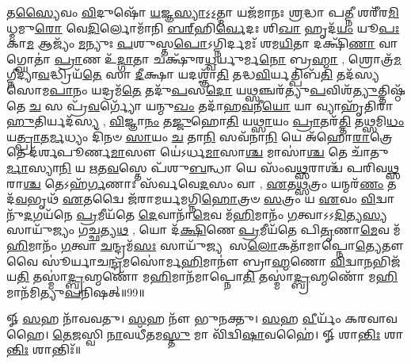 𑌤\-\ul{𑌸𑍍𑌯𑍈}\-𑌵𑌂  \ul{𑌵𑌿}\-𑌦𑍁𑌷𑍋᳴ \ul{𑌯}\-𑌜𑍍𑌞\-\ul{𑌸𑍍𑌯𑌾}\-𑌽॒𑌽॒𑌤𑍍𑌮𑌾 𑌯𑌜᳴𑌮𑌾𑌨𑌃 \ul{𑌶𑍍𑌰}\-𑌦𑍍𑌧𑌾 𑌪\-\ul{𑌤𑍍𑌨𑍀} 𑌶𑌰𑍀᳴𑌰\-\ul{𑌮𑌿}\-𑌧𑍍𑌮𑌮𑍁\-\ul{𑌰𑍋} 𑌵𑍇\-\ul{𑌦𑌿}\-𑌰𑍍𑌲𑍋𑌮𑌾᳴𑌨𑌿 \ul{𑌬}\-\-\ul{𑌰𑍍}\-‌𑌹𑌿\-\ul{𑌰𑍍𑌵𑍇}\-𑌦𑌃 𑌶𑌿\-\ul{𑌖𑌾} 𑌹𑍃𑌦᳴\-\ul{𑌯𑌂} 𑌯𑍂\-\ul{𑌪𑌃} 𑌕𑌾\-\ul{𑌮} 𑌆𑌜𑍍𑌯𑌂᳴ \ul{𑌮}\-𑌨𑍍𑌯𑍁𑌃 \ul{𑌪}\-𑌶𑍁𑌸𑍍𑌤\-\ul{𑌪𑍋}\-𑌽𑌗𑍍𑌨𑌿𑌰𑍍𑌦𑌮𑌃᳴ 𑌶𑌮\-\ul{𑌯𑌿}\-𑌤𑌾 𑌦𑌕𑍍𑌷𑌿᳴\-\ul{𑌣𑌾} 𑌵𑌾𑌗𑍍𑌘𑍋𑌤𑌾॑ \ul{𑌪𑍍𑌰𑌾}\-𑌣 𑌉᳴\-\ul{𑌦𑍍𑌗𑌾}\-𑌤𑌾 𑌚𑌕𑍍𑌷𑍁᳴𑌰\-\ul{𑌧𑍍𑌵}\-𑌰𑍍𑌯𑍁𑌰𑍍𑌮\-\ul{𑌨𑍋} 𑌬𑍍𑌰\-\ul{𑌹𑍍𑌮𑌾} \sep 
𑌶𑍍𑌰𑍋𑌤𑍍𑌰᳴\-\ul{𑌮}\-𑌗𑍍𑌨𑍀𑌦𑍍𑌯𑌾\-\ul{𑌵}\-𑌦𑍍𑌧𑍍𑌰𑌿𑌯᳴\-\ul{𑌤𑍇} 𑌸𑌾 \ul{𑌦𑍀}\-𑌕𑍍𑌷𑌾 𑌯𑌦𑌶𑍍𑌞𑌾᳴\-\ul{𑌤𑌿} 𑌤𑌦𑍍𑌧\-\ul{𑌵𑌿}\-𑌰𑍍𑌯𑌤𑍍𑌪𑌿𑌬᳴\-\ul{𑌤𑌿} 𑌤𑌦᳴𑌸𑍍𑌯 𑌸𑍋𑌮\-\ul{𑌪𑌾}\-𑌨𑌂 𑌯𑌦𑍍𑌰𑌮᳴\-\ul{𑌤𑍇} 𑌤𑌦𑍁᳴\-\ul{𑌪}\-𑌸\-\ul{𑌦𑍋} 𑌯\-\ul{𑌥𑍍𑌸}\-𑌞𑍍𑌚𑌰᳴𑌤𑍍𑌯𑍁\-\ul{𑌪}\-𑌵𑌿𑌶᳴\-\ul{𑌤𑍍𑌯𑍁}\-𑌤𑍍𑌤𑌿𑌷𑍍𑌠᳴𑌤𑍇 \ul{𑌚} 𑌸 𑌪𑍍𑌰᳴\-\ul{𑌵}\-𑌰𑍍𑌗𑍍𑌯𑍋᳴ 𑌯𑌨𑍍𑌮𑍁\-\ul{𑌖𑌂} 𑌤𑌦𑌾᳴𑌹\-\ul{𑌵}\-𑌨𑍀\-\ul{𑌯𑍋} 𑌯𑌾 𑌵𑍍𑌯𑌾𑌹𑍃᳴𑌤𑌿𑌰𑌾\-\ul{𑌹𑍁}\-𑌤𑌿𑌰𑍍𑌯𑌦᳴𑌸𑍍𑌯 \sep 
\-\ul{𑌵𑌿}\-𑌜𑍍𑌞𑌾\-\ul{𑌨𑌂} 𑌤\-\ul{𑌜𑍍𑌜𑍁}\-𑌹𑍋\-\ul{𑌤𑌿} 𑌯\-\ul{𑌥𑍍𑌸𑌾}\-𑌯𑌂 \ul{𑌪𑍍𑌰𑌾}\-𑌤𑌰᳴\-\ul{𑌤𑍍𑌤𑌿} 𑌤\-\ul{𑌥𑍍𑌸}\-𑌮𑌿\-\ul{𑌧𑌂} 𑌯\-\ul{𑌤𑍍𑌪𑍍𑌰𑌾}\-𑌤\-\ul{𑌰𑍍𑌮}\-𑌧𑍍𑌯𑌂 𑌦𑌿᳴𑌨𑍞 \ul{𑌸𑌾}\-𑌯𑌂  \ul{𑌚} 𑌤𑌾\-\ul{𑌨𑌿} 𑌸𑌵᳴𑌨𑌾\-\ul{𑌨𑌿} 𑌯𑍇 𑌅᳴𑌹𑍋\-\ul{𑌰𑌾}\-𑌤𑍍𑌰𑍇 𑌤𑍇 𑌦᳴𑌰𑍍\mbox{}𑌶𑌪𑍂𑌰𑍍𑌣\-\ul{𑌮𑌾}\-𑌸𑍗 𑌯𑍇॑𑌽𑌰𑍍𑌧\-\ul{𑌮𑌾}\-𑌸𑌾\-\ul{𑌶𑍍𑌚} 𑌮𑌾𑌸𑌾॑\-\ul{𑌶𑍍𑌚} 𑌤𑍇 𑌚𑌾᳴𑌤𑍁\-\ul{𑌰𑍍𑌮𑌾}\-𑌸𑍍𑌯𑌾\-\ul{𑌨𑌿} 𑌯 \ul{𑌋}\-𑌤\-\ul{𑌵}\-𑌸𑍍𑌤𑍇 𑌪᳴𑌶𑍁\-\ul{𑌬}\-𑌨𑍍𑌧𑌾 𑌯𑍇 𑌸𑌂᳴𑌵\-\ul{𑌥𑍍𑌸}\-𑌰𑌾𑌶𑍍𑌚᳴ 𑌪𑌰𑌿𑌵\-\ul{𑌥𑍍𑌸}\-𑌰𑌾\-\ul{𑌶𑍍𑌚} 𑌤𑍇𑌽𑌹᳴\-\ul{𑌰𑍍𑌗}\-𑌣𑌾𑌃 𑌸᳴𑌰𑍍𑌵𑌵𑍇\-\ul{𑌦}\-𑌸𑌂 𑌵𑌾 \sep 
\-\ul{𑌏}\-𑌤\-\ul{𑌥𑍍𑌸}\-𑌤𑍍𑌰𑌂 𑌯𑌨𑍍𑌮𑌰᳴\-\ul{𑌣𑌂} 𑌤𑌦᳴\-\ul{𑌵}\-𑌭𑍃𑌥᳴ \ul{𑌏}\-𑌤𑌦𑍍𑌵𑍈 𑌜᳴𑌰𑌾𑌮𑌰𑍍𑌯𑌮𑌗𑍍𑌨𑌿\-\ul{𑌹𑍋}\-𑌤𑍍𑌰𑍞 \ul{𑌸}\-𑌤𑍍𑌰𑌂 𑌯 \ul{𑌏}\-𑌵𑌂  \ul{𑌵𑌿}\-𑌦𑍍𑌵𑌾𑌨𑍁᳴\-\ul{𑌦}\-𑌗𑌯᳴𑌨𑍇 \ul{𑌪𑍍𑌰}\-𑌮𑍀𑌯᳴𑌤𑍇 \ul{𑌦𑍇}\-𑌵𑌾𑌨𑌾᳴\-\ul{𑌮𑍇}\-𑌵 𑌮᳴\-\ul{𑌹𑌿}\-𑌮𑌾𑌨𑌂᳴ \ul{𑌗}\-𑌤𑍍𑌵𑌾𑌽𑌽\-\ul{𑌦𑌿}\-𑌤𑍍𑌯\-\ul{𑌸𑍍𑌯} 𑌸𑌾𑌯𑍁᳴𑌜𑍍𑌯𑌂 𑌗\-\ul{𑌚𑍍𑌛}\-𑌤𑍍𑌯\-\ul{𑌥} \sep
𑌯𑍋 𑌦᳴\-\ul{𑌕𑍍𑌷𑌿}\-𑌣𑍇 \ul{𑌪𑍍𑌰}\-𑌮𑍀𑌯᳴𑌤𑍇 𑌪𑌿\-\ul{𑌤𑍃}\-𑌣𑌾\-\ul{𑌮𑍇}\-𑌵 𑌮᳴\-\ul{𑌹𑌿}\-𑌮𑌾𑌨𑌂᳴ \ul{𑌗}\-𑌤𑍍𑌵𑌾 \ul{𑌚}\-𑌨𑍍𑌦𑍍𑌰𑌮᳴\-\ul{𑌸𑌃} 𑌸𑌾𑌯𑍁᳴𑌜𑍍𑌯 𑌸\-\ul{𑌲𑍋}\-𑌕𑌤𑌾᳴𑌮𑌾𑌪𑍍𑌨𑍋\-\ul{𑌤𑍍𑌯𑍇}\-𑌤𑍗 𑌵𑍈 𑌸𑍂॑𑌰𑍍𑌯𑌾𑌚\-\ul{𑌨𑍍𑌦𑍍𑌰}\-𑌮𑌸𑍋॑𑌰𑍍𑌮\-\ul{𑌹𑌿}\-𑌮𑌾𑌨𑍗॑ 𑌬𑍍𑌰𑌾\-\ul{𑌹𑍍𑌮}\-𑌣𑍋 \ul{𑌵𑌿}\-𑌦𑍍𑌵𑌾\-\ul{𑌨}\-𑌭𑌿𑌜᳴𑌯\-\ul{𑌤𑌿} 𑌤𑌸𑍍𑌮𑌾॑\-\ul{𑌦𑍍𑌬𑍍𑌰}\-𑌹𑍍𑌮𑌣𑍋᳴ 𑌮\-\ul{𑌹𑌿}\-𑌮𑌾𑌨᳴𑌮𑌾𑌪𑍍𑌨𑍋\-\ul{𑌤𑌿} 𑌤𑌸𑍍𑌮𑌾॑\-\ul{𑌦𑍍𑌬𑍍𑌰}\-𑌹𑍍𑌮𑌣𑍋᳴ 𑌮\-\ul{𑌹𑌿}\-𑌮𑌾𑌨᳴𑌮𑌿𑌤𑍍𑌯𑍁\-\ul{𑌪}\-𑌨𑌿𑌷𑌤𑍍॥99॥
\anuvakamend

𑍐 \ul{𑌸}\-𑌹 𑌨𑌾᳴𑌵𑌵𑌤𑍁। 
\-\ul{𑌸}\-𑌹 𑌨𑍗᳴ 𑌭𑍁𑌨𑌕𑍍𑌤𑍁। 
\-\ul{𑌸}\-𑌹 \ul{𑌵𑍀}\-𑌰𑍍𑌯𑌂᳴ 𑌕𑌰𑌵𑌾𑌵𑌹𑍈। 
\-\ul{𑌤𑍇}\-\-\ul{𑌜}\-𑌸𑍍𑌵𑌿 \ul{𑌨𑌾}\-𑌵𑌧𑍀᳴𑌤𑌮\-\ul{𑌸𑍍𑌤𑍁} 𑌮𑌾 𑌵𑌿᳴𑌦𑍍𑌵𑌿\-\ul{𑌷𑌾}\-𑌵𑌹𑍈॑। 
𑍐 𑌶𑌾\-\ul{𑌨𑍍𑌤𑌿𑌃} 𑌶𑌾\-\ul{𑌨𑍍𑌤𑌿𑌃} 𑌶𑌾𑌨𑍍𑌤𑌿𑌃᳴॥

\closesection
\clearpage
